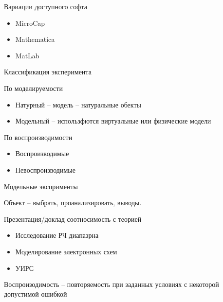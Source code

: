 \documentclass[a4paper,12pt]{report}
\begin{document}
	\def \nocredits {}
	\def \LineE {Конспект по дисциплине}
	\def \LineF {Теория эксперимента}

	\maketitle




	Вариации доступного софта
	\begin{itemize}
	\item	MicroCap
	\item	Mathematica
	\item	MatLab
	\end{itemize}

	Классификация эксперимента
	
	По моделируемости
	\begin{itemize}
	\item	Натурный – модель – натуральные обекты
	\item	Модельный – использфются виртуальные или физические модели
	\end{itemize}
	
	По воспроизводимости
	\begin{itemize}
	\item	Воспроизводимые
	\item	Невоспроизводимые
	\end{itemize}


	Модельные эксприменты

	Объект – выбрать, проанализировать, выводы.

	Презентация/доклад соотносимость с теорией

	\begin{itemize}
	\item	Исследование  РЧ диапазрна
	\item	Моделирование электронных схем
	\item	УИРС
	\end{itemize}

	Воспроизодимость – повторяемость при заданных условиях с некоторой допустимой ошибкой




\end{document}
